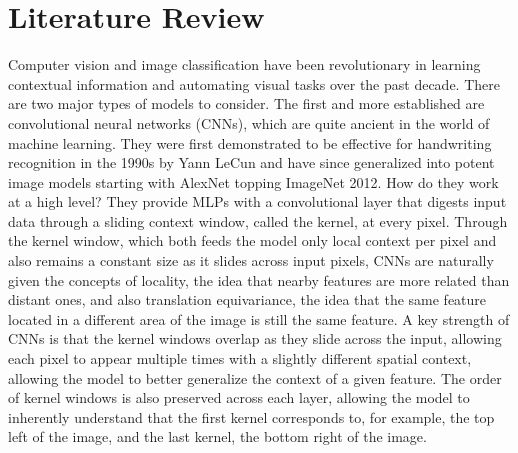 \documentclass{article}
\begin{document}
\section{Literature Review}

Computer vision and image classification have been revolutionary in learning contextual information and automating visual tasks over the past decade. There are two major types of models to consider. The first and more established are convolutional neural networks (CNNs), which are quite ancient in the world of machine learning. They were first demonstrated to be effective for handwriting recognition in the 1990s by Yann LeCun and have since generalized into potent image models starting with AlexNet topping ImageNet 2012. How do they work at a high level? They provide MLPs with a convolutional layer that digests input data through a sliding context window, called the kernel, at every pixel. Through the kernel window, which both feeds the model only local context per pixel and also remains a constant size as it slides across input pixels, CNNs are naturally given the concepts of locality, the idea that nearby features are more related than distant ones, and also translation equivariance, the idea that the same feature located in a different area of the image is still the same feature. A key strength of CNNs is that the kernel windows overlap as they slide across the input, allowing each pixel to appear multiple times with a slightly different spatial context, allowing the model to better generalize the context of a given feature. The order of kernel windows is also preserved across each layer, allowing the model to inherently understand that the first kernel corresponds to, for example, the top left of the image, and the last kernel, the bottom right of the image.
\end{document}
